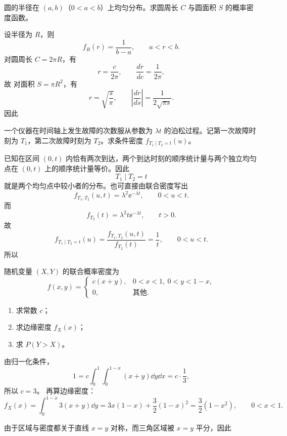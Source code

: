 \begin{question}
圆的半径在 $(a,b)$（$0<a<b$）上均匀分布。求圆周长 $C$ 与圆面积 $S$ 的概率密度函数。
\begin{solution}
设半径为 $R$，则
\[
f_R(r)=\frac{1}{b-a},\qquad a<r<b.
\]
对圆周长 $C=2\pi R$，有
\[
r=\frac{c}{2\pi},\qquad \frac{dr}{dc}=\frac{1}{2\pi},
\]
故
对面积 $S=\pi R^2$，有
\[
r=\sqrt{\frac{s}{\pi}},\qquad
\left|\frac{dr}{ds}\right|=\frac{1}{2\sqrt{\pi s}}.
\]
因此
\end{solution}
\end{question}

\begin{question}
一个仪器在时间轴上发生故障的次数服从参数为 $\lambda t$ 的泊松过程。记第一次故障时刻为 $T_1$，第二次故障时刻为 $T_2$。求条件密度 $f_{T_1\mid T_2=t}(u)$。
\begin{solution}
已知在区间 $(0,t)$ 内恰有两次到达，两个到达时刻的顺序统计量与两个独立均匀点在 $(0,t)$ 上的顺序统计量等价。因此
\[
T_1\mid T_2=t
\]
就是两个均匀点中较小者的分布。也可直接由联合密度写出
\[
f_{T_1,T_2}(u,t)=\lambda^2 \ee^{-\lambda t},\qquad 0<u<t.
\]
而
\[
f_{T_2}(t)=\lambda^2 t \ee^{-\lambda t},\qquad t>0.
\]
故
\[
f_{T_1\mid T_2=t}(u)=\frac{f_{T_1,T_2}(u,t)}{f_{T_2}(t)}
=\frac{1}{t},\qquad 0<u<t.
\]
所以
\end{solution}
\end{question}

\begin{question}
随机变量 $(X,Y)$ 的联合概率密度为
\[
f(x,y)=\begin{cases}
c(x+y),&0<x<1,\ 0<y<1-x,\\
0,&\text{其他}.
\end{cases}
\]
\begin{enumerate}[label=(\alph*),leftmargin=2.8em,itemsep=0.2em]
\item 求常数 $c$；
\item 求边缘密度 $f_X(x)$；
\item 求 $P(Y>X)$。
\end{enumerate}
\begin{solution}
由归一化条件，
\[
1=c\int_0^1\int_0^{1-x}(x+y)\dd{y}\dd{x}
=c\cdot \frac13,
\]
所以 $c=3$。
再算边缘密度：
\[
f_X(x)=\int_0^{1-x}3(x+y)\dd{y}
=3x(1-x)+\frac32(1-x)^2
=\frac32(1-x^2),\qquad 0<x<1.
\]

由于区域与密度都关于直线 $x=y$ 对称，而三角区域被 $x=y$ 平分，因此
\end{solution}
\end{question}

